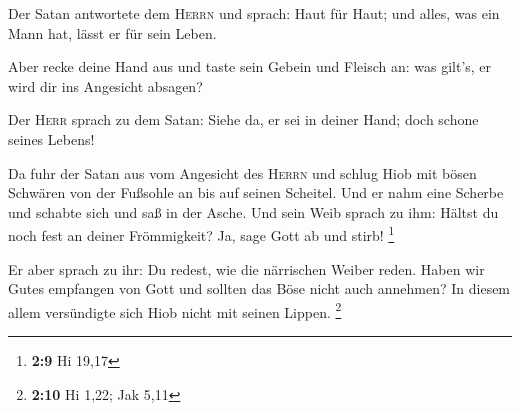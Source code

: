  Der Satan antwortete dem \textsc{Herrn} und sprach: Haut
für Haut; und alles, was ein Mann hat, lässt er für sein Leben.

 Aber recke deine Hand aus und taste sein Gebein und
Fleisch an: was gilt's, er wird dir ins Angesicht absagen?

 Der \textsc{Herr} sprach zu dem Satan: Siehe da, er sei
in deiner Hand; doch schone seines Lebens!

 Da fuhr der Satan aus vom Angesicht des \textsc{Herrn}
und schlug Hiob mit bösen Schwären von der Fußsohle an bis auf seinen
Scheitel.  Und er nahm eine Scherbe und schabte sich und
saß in der Asche.  Und sein Weib sprach zu ihm: Hältst du
noch fest an deiner Frömmigkeit? Ja, sage Gott ab und stirb! \footnote{\textbf{2:9}
  Hi 19,17}

 Er aber sprach zu ihr: Du redest, wie die närrischen
Weiber reden. Haben wir Gutes empfangen von Gott und sollten das Böse
nicht auch annehmen? In diesem allem versündigte sich Hiob nicht mit
seinen Lippen. \footnote{\textbf{2:10} Hi 1,22; Jak 5,11}

